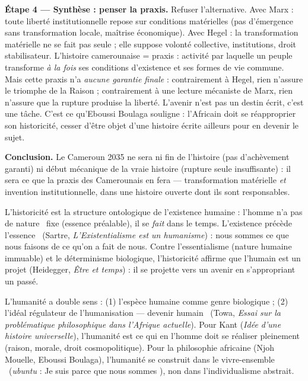 \documentclass[11pt]{article}
\newcommand{\cle}[1]{{\popxbold\color{popdark}#1}}
\newcounter{popsec}
\newcounter{popsub}
\newcommand{\courssub}[1]{%
  \stepcounter{popsub}%
  \par\vspace{9pt}\noindent{\popxbold\fontsize{11.5}{13}\selectfont\color{popink}{\color{poporange}\thepopsec.\thepopsub}\hspace{6pt}#1}\par\nopagebreak\vspace{4pt}
}
\begin{document}
\begin{exoresolu}
\textbf{Étape 4 — Synthèse : penser la praxis.} Refuser l'alternative. Avec Marx : toute liberté institutionnelle repose sur conditions matérielles (pas d'émergence sans transformation locale, maîtrise économique). Avec Hegel : la transformation matérielle ne se fait pas seule ; elle suppose volonté collective, institutions, droit stabilisateur. L'histoire camerounaise = \cle{praxis} : activité par laquelle un peuple transforme \emph{à la fois} ses conditions d'existence et ses formes de vie commune. Mais cette praxis n'a \emph{aucune garantie finale} : contrairement à Hegel, rien n'assure le triomphe de la Raison ; contrairement à une lecture mécaniste de Marx, rien n'assure que la rupture produise la liberté. L'\cle{avenir} n'est pas un destin écrit, c'est une tâche. C'est ce qu'Eboussi Boulaga souligne : l'Africain doit se réapproprier son historicité, cesser d'être objet d'une histoire écrite ailleurs pour en devenir le sujet.

\textbf{Conclusion.} Le Cameroun 2035 ne sera ni fin de l'histoire (pas d'achèvement garanti) ni début mécanique de la vraie histoire (rupture seule insuffisante) : il sera ce que la praxis des Camerounais en fera — transformation matérielle \emph{et} invention institutionnelle, dans une histoire ouverte dont ils sont responsables.
\end{exoresolu}

\courssub{Notions transversales : Humanité, Devenir, Avenir}

\begin{definition}[Historicité]
L'\cle{historicité} est la structure ontologique de l'existence humaine : l'homme n'a pas de \guillemotleft nature \guillemotright\ fixe (essence préalable), il se \emph{fait} dans le temps. \guillemotleft L'existence précède l'essence \guillemotright\ (Sartre, \emph{L'Existentialisme est un humanisme}) : nous sommes ce que nous faisons de ce qu'on a fait de nous. Contre l'essentialisme (nature humaine immuable) et le déterminisme biologique, l'historicité affirme que l'humain est un \cle{projet} (Heidegger, \emph{Être et temps}) : il se projette vers un avenir en s'appropriant un passé.
\end{definition}

\begin{definition}[Humanité]
L'\cle{humanité} a double sens : (1) l'espèce humaine comme genre biologique ; (2) l'idéal régulateur de l'humanisation — \guillemotleft devenir humain \guillemotright\ (Towa, \emph{Essai sur la problématique philosophique dans l'Afrique actuelle}). Pour Kant (\emph{Idée d'une histoire universelle}), l'humanité est ce qui en l'homme doit se réaliser pleinement (raison, morale, droit cosmopolitique). Pour la philosophie africaine (Njoh Mouelle, Eboussi Boulaga), l'humanité se construit dans le \guillemotleft vivre-ensemble \guillemotright\ (\emph{ubuntu} : \guillemotleft Je suis parce que nous sommes \guillemotright), non dans l'individualisme abstrait.
\end{definition}
\end{document}

